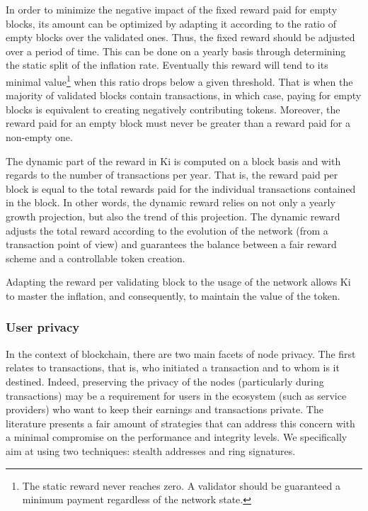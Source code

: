 In order to minimize the negative impact of the fixed reward paid for empty blocks, its amount can be optimized by adapting it according to the ratio of empty blocks over the validated ones. Thus, the fixed reward should be adjusted over a period of time. This can be done on a yearly basis through determining the static split of the inflation rate. Eventually this reward will tend to its minimal value\footnote{The static reward never reaches zero. A validator should be guaranteed a minimum payment regardless of the network state.} when this ratio drops below a given threshold. That is when the majority of validated blocks contain transactions, in which case, paying for empty blocks is equivalent to creating negatively contributing tokens. Moreover, the reward paid for an empty block must never be greater than a reward paid for a non-empty one.

The dynamic part of the reward in Ki is computed on a block basis and with regards to the number of transactions per year. That is, the reward paid per block is equal to the total rewards paid for the individual transactions contained in the block.  In other words, the dynamic reward  relies on not only a yearly growth projection, but also the trend of this projection. The dynamic reward adjusts the total reward according to the evolution of the network (from a transaction point of view) and guarantees the balance between a fair reward scheme and a controllable token creation.

Adapting the reward per validating block to the usage of the network allows Ki to master the inflation, and consequently, to maintain the value of the token.

\subsubsection{User privacy}
\label{sec:kiblockchainprivacy}
In the context of blockchain, there are two main facets of node privacy. The first relates to transactions, that is, who initiated a transaction and to whom is it destined. Indeed, preserving the privacy of the nodes (particularly during transactions) may be a requirement for users in the ecosystem (such as service providers) who want to keep their earnings and transactions private. The literature presents a fair amount of strategies that can address this concern with a minimal compromise on the performance and integrity levels. We specifically aim at using two techniques: stealth addresses\cite{CryptoNote} and ring signatures\cite{rivest2001leak}.


